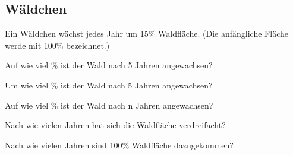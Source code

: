\platzFuerBerechnungenBisEndeSeite{}
\subsection{Wäldchen}
Ein Wäldchen wächst jedes Jahr um 15\% Waldfläche. (Die anfängliche Fläche werde mit
100\% bezeichnet.)
\begin{bbwAufgabenBlock}
\item Auf wie viel \% ist der Wald nach 5 Jahren angewachsen?  \plz{}
\item Um wie viel \% ist der Wald nach 5 Jahren angewachsen?  \plz{}
\item Auf wie viel \% ist der Wald nach n Jahren
angewachsen?  \plz{} \noTRAINER{\newpage}
\item Nach wie vielen Jahren hat sich die Waldfläche
verdreifacht?  \plz{}
\item Nach wie vielen Jahren sind 100\% Waldfläche
dazugekommen?  \plz{}
\end{bbwAufgabenBlock}

\platzFuerBerechnungenBisEndeSeite{}

